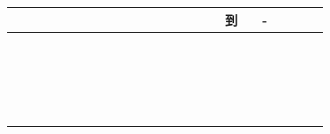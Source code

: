 \documentclass[10pt]{article}
\begin{document}
\begin{center}
\begin{tabular}{|c|c|c|c|c|c|c|c|c|c|c|c|c|c|c|c|c|c|c|c|c|c|c|c|}
\hline
 &  &  &  &  &  &  &  &  &  &  &  &  &  &  &  &  & 到 &  & - &  &  &  &  \\
\hline
 &  &  &  &  &  &  &  &  &  &  &  &  &  &  &  &  &  &  &  &  &  &  &  \\
\hline
 &  &  &  &  &  &  &  &  &  &  &  &  &  &  &  &  &  &  &  &  &  &  &  \\
\hline
 &  &  &  &  &  &  &  &  &  &  &  &  &  &  &  &  &  &  &  &  &  &  &  \\
\hline
 &  &  &  &  &  &  &  &  &  &  &  &  &  &  &  &  &  &  &  &  &  &  &  \\
\hline
 &  &  &  &  &  &  &  &  &  &  &  &  &  &  &  &  &  &  &  &  &  &  &  \\
\hline
 &  &  &  &  &  &  &  &  &  &  &  &  &  &  &  &  &  &  &  &  &  &  &  \\
\hline
 &  &  &  &  &  &  &  &  &  &  &  &  &  &  &  &  &  &  &  &  &  &  &  \\
\hline
 &  &  &  &  &  &  &  &  &  &  &  &  &  &  &  &  &  &  &  &  &  &  &  \\
\hline
 &  &  &  &  &  &  &  &  &  &  &  &  &  &  &  &  &  &  &  &  &  &  &  \\
\hline
 &  &  &  &  &  &  &  &  &  &  &  &  &  &  &  &  &  &  &  &  &  &  &  \\
\hline
 &  &  &  &  &  &  &  &  &  &  &  &  &  &  &  &  &  &  &  &  &  &  &  \\
\hline
 &  &  &  &  &  &  &  &  &  &  &  &  &  &  &  &  &  &  &  &  &  &  &  \\
\hline
 &  &  &  &  &  &  &  &  &  &  &  &  &  &  &  &  &  &  &  &  &  &  &  \\
\hline
 &  &  &  &  &  &  &  &  &  &  &  &  &  &  &  &  &  &  &  &  &  &  &  \\
\hline
 &  &  &  &  &  &  &  &  &  &  &  &  &  &  &  &  &  &  &  &  &  &  &  \\
\hline
 &  &  &  &  &  &  &  &  &  &  &  &  &  &  &  &  &  &  &  &  &  &  &  \\
\hline
 &  &  &  &  &  &  &  &  &  &  &  &  &  &  &  &  &  &  &  &  &  &  &  \\
\hline
 &  &  &  &  &  &  &  &  &  &  &  &  &  &  &  &  &  &  &  &  &  &  &  \\
\hline
 &  &  &  &  &  &  &  &  &  &  &  &  &  &  &  &  &  &  &  &  &  &  &  \\
\hline
 &  &  &  &  &  &  &  &  &  &  &  &  &  &  &  &  &  &  &  &  &  &  &  \\

\end{tabular}
\end{center}
\end{document}
